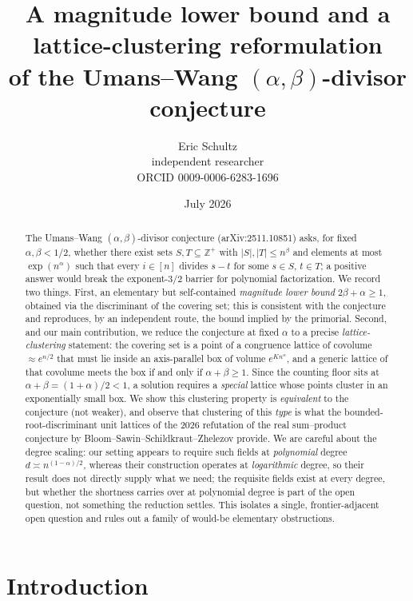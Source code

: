 \documentclass[11pt]{article}
\title{A magnitude lower bound and a lattice-clustering reformulation \\
of the Umans--Wang $(\alpha,\beta)$-divisor conjecture}
\author{Eric Schultz\\ \small independent researcher \\ \small ORCID 0009-0006-6283-1696}
\date{July 2026}
\theoremstyle{definition}
\newcommand{\Z}{\mathbb{Z}}
\begin{document}
\maketitle

\begin{abstract}
The Umans--Wang $(\alpha,\beta)$-divisor conjecture (arXiv:2511.10851) asks, for
fixed $\alpha,\beta<1/2$, whether there exist sets $S,T\subseteq\Z^+$ with
$|S|,|T|\le n^{\beta}$ and elements at most $\exp(n^{\alpha})$ such that every
$i\in[n]$ divides $s-t$ for some $s\in S,\,t\in T$; a positive answer would break
the exponent-$3/2$ barrier for polynomial factorization. We record two things.
First, an elementary but self-contained \emph{magnitude lower bound}
$2\beta+\alpha\ge 1$, obtained via the discriminant of the covering set; this is
consistent with the conjecture and reproduces, by an independent route, the bound
implied by the primorial. Second, and our main contribution, we reduce the
conjecture at fixed $\alpha$ to a precise \emph{lattice-clustering} statement: the
covering set is a point of a congruence lattice of covolume $\approx e^{n/2}$ that
must lie inside an axis-parallel box of volume $e^{K n^{\alpha}}$, and a
generic lattice of that covolume meets the box if and only if $\alpha+\beta\ge 1$.
Since the counting floor sits at $\alpha+\beta=(1+\alpha)/2<1$, a solution requires
a \emph{special} lattice whose points cluster in an exponentially small box. We show
this clustering property is \emph{equivalent} to the conjecture (not weaker), and
observe that clustering of this \emph{type} is what the bounded-root-discriminant
unit lattices of the 2026 refutation of the real sum--product conjecture by
Bloom--Sawin--Schildkraut--Zhelezov provide. We are careful about the degree
scaling: our setting appears to require such fields at \emph{polynomial} degree
$d\asymp n^{(1-\alpha)/2}$, whereas their construction operates at
\emph{logarithmic} degree, so their result does not directly supply what we need;
the requisite fields exist at every degree, but whether the shortness carries over
at polynomial degree is part of the open question, not something the reduction
settles. This isolates a single, frontier-adjacent open question and rules out a
family of would-be elementary obstructions.
\end{abstract}

\section{Introduction}
\end{document}
